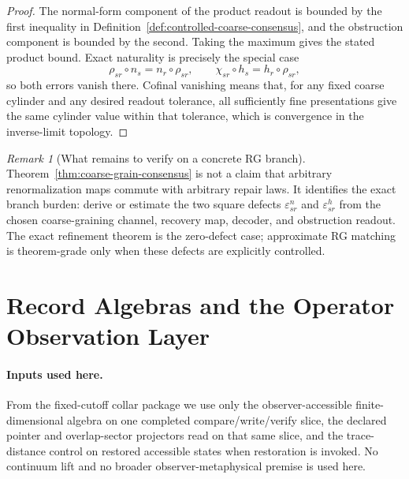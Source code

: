 \documentclass[11pt]{article}
\theoremstyle{remark}
\newtheorem{remark}[theorem]{Remark}
\theoremstyle{plain}
\begin{document}
\begin{proof}
The normal-form component of the product readout is bounded by the first inequality in
Definition~\ref{def:controlled-coarse-consensus}, and the obstruction component is bounded by the
second. Taking the maximum gives the stated product bound. Exact naturality is precisely the
special case
\[
\rho_{sr}\circ n_s=n_r\circ\rho_{sr},
\qquad
\chi_{sr}\circ h_s=h_r\circ\rho_{sr},
\]
so both errors vanish there. Cofinal vanishing means that, for any fixed coarse cylinder and any
desired readout tolerance, all sufficiently fine presentations give the same cylinder value
within that tolerance, which is convergence in the inverse-limit topology.
\end{proof}

\begin{remark}[What remains to verify on a concrete RG branch]\label{rem:coarse-grain-scope}
Theorem~\ref{thm:coarse-grain-consensus} is not a claim that arbitrary renormalization maps
commute with arbitrary repair laws. It identifies the exact branch burden: derive or estimate the
two square defects \(\varepsilon^n_{sr}\) and \(\varepsilon^h_{sr}\) from the chosen
coarse-graining channel, recovery map, decoder, and obstruction readout. The exact refinement
theorem is the zero-defect case; approximate RG matching is theorem-grade only when these defects
are explicitly controlled.
\end{remark}


\section{Record Algebras and the Operator Observation Layer}

\paragraph{Inputs used here.}
From the fixed-cutoff collar package we use only the observer-accessible finite-dimensional algebra
on one completed compare/write/verify slice, the declared pointer and overlap-sector projectors
read on that same slice, and the trace-distance control on restored accessible states when
restoration is invoked. No continuum lift and no broader observer-metaphysical premise is used
here.
\end{document}

